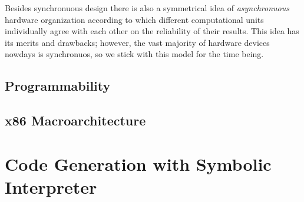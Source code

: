 Besides synchronuous design there is also a symmetrical idea of \emph{asynchronuous} hardware organization according to which
different computational units individually agree with each other on the reliability of their results. This idea has its
merits and drawbacks; however, the vast majority of hardware devices nowdays is synchronuos, so we stick with this model for
the time being.

\subsection{Programmability}

\subsection{x86 Macroarchitecture}

\section{Code Generation with Symbolic Interpreter}

\section{}


